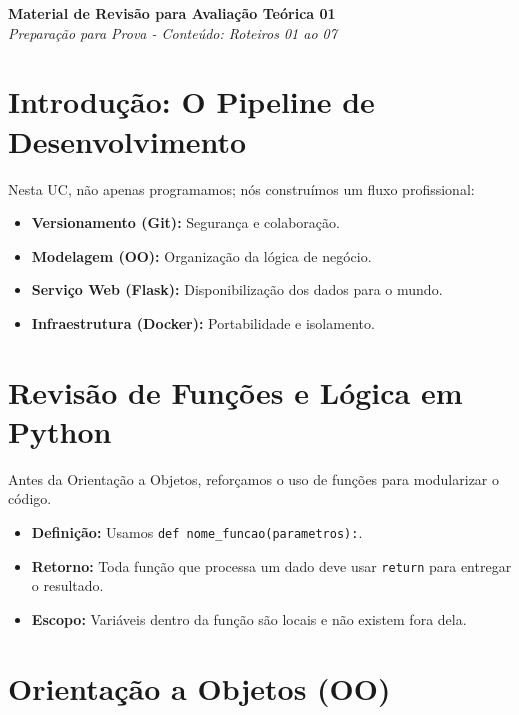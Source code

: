 \documentclass[12pt,a4paper]{article}
\begin{document}
\begin{center}
    {\LARGE \textbf{Material de Revisão para Avaliação Teórica 01}}\\
    \vspace{0.2cm}
    \textit{Preparação para Prova - Conteúdo: Roteiros 01 ao 07}
\end{center}

\vspace{0.5cm}

\section{Introdução: O Pipeline de Desenvolvimento}

Nesta UC, não apenas programamos; nós construímos um fluxo profissional:
\begin{itemize}
    \item \textbf{Versionamento (Git):} Segurança e colaboração.
    \item \textbf{Modelagem (OO):} Organização da lógica de negócio.
    \item \textbf{Serviço Web (Flask):} Disponibilização dos dados para o mundo.
    \item \textbf{Infraestrutura (Docker):} Portabilidade e isolamento.
\end{itemize}

\section{Revisão de Funções e Lógica em Python}

Antes da Orientação a Objetos, reforçamos o uso de funções para modularizar o código.

\begin{boxAtividade}
\begin{itemize}
    \item \textbf{Definição:} Usamos \texttt{def nome\_funcao(parametros):}.
    \item \textbf{Retorno:} Toda função que processa um dado deve usar \texttt{return} para entregar o resultado.
    \item \textbf{Escopo:} Variáveis dentro da função são locais e não existem fora dela.
\end{itemize}
\end{boxAtividade}

\section{Orientação a Objetos (OO)}
\end{document}
